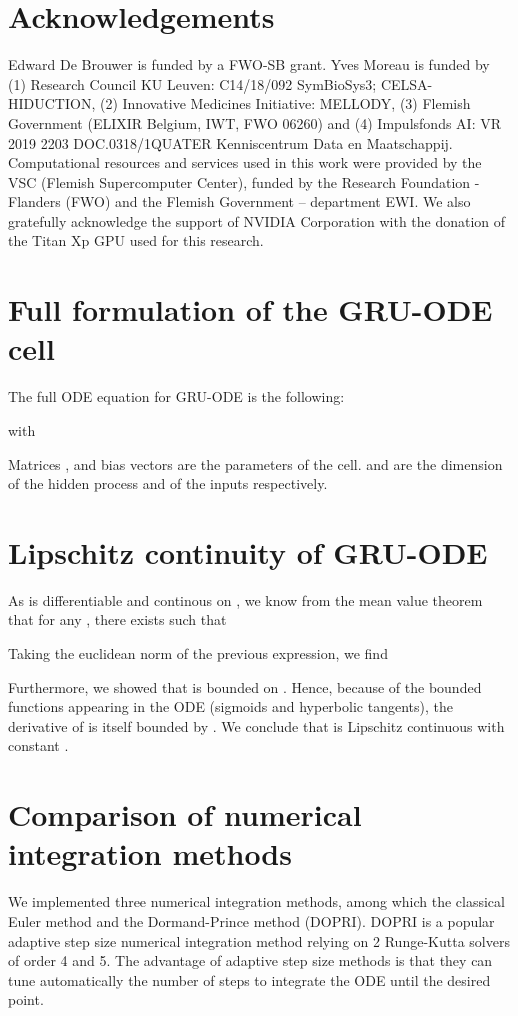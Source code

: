 \documentclass{article}
\begin{document}
\section*{Acknowledgements}

Edward De Brouwer is funded by a FWO-SB grant. Yves Moreau is funded by (1) Research Council KU Leuven: C14/18/092 SymBioSys3; CELSA-HIDUCTION, (2) Innovative Medicines Initiative: MELLODY, (3) Flemish Government (ELIXIR Belgium, IWT, FWO 06260) and (4) Impulsfonds AI: VR 2019 2203 DOC.0318/1QUATER Kenniscentrum Data en Maatschappij. Computational resources and services used in this work were provided by the VSC (Flemish Supercomputer Center), funded by the Research Foundation - Flanders (FWO) and the Flemish Government – department EWI. We also gratefully acknowledge the support of NVIDIA Corporation with the donation of the Titan Xp GPU used for this research.

\vfill




\newpage

\appendix

\section{Full formulation of the GRU-ODE cell}
\label{app:gru-ode-full}
The full ODE equation for GRU-ODE is the following:



with


  
Matrices ,  and bias vectors  are the parameters of the cell.  and  are the dimension of the hidden process and of the inputs respectively.

\section{Lipschitz continuity of GRU-ODE}
\label{app:continuity}
As  is differentiable and continous on , we know from the mean value theorem that for any , there exists  such that 

Taking the euclidean norm of the previous expression, we find 

Furthermore, we showed that  is bounded on . Hence, because of the bounded functions appearing in the ODE (sigmoids and hyperbolic tangents), the derivative of  is itself bounded by . We conclude that  is Lipschitz continuous with constant .

\section{Comparison of numerical integration methods}
\label{app:dopri}
We implemented three numerical integration methods, among which the classical Euler method and the Dormand-Prince method (DOPRI). DOPRI is a popular adaptive step size numerical integration method relying on 2 Runge-Kutta solvers of order 4 and 5. The advantage of adaptive step size methods is that they can tune automatically the number of steps to integrate the ODE until the desired point.
\end{document}
